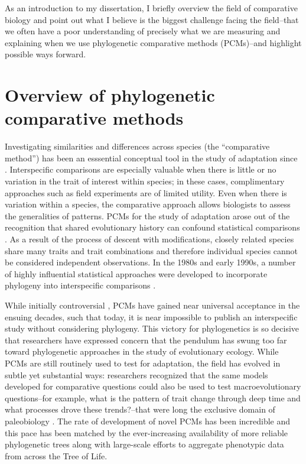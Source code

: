 As an introduction to my dissertation, I briefly overview the field of comparative biology \citep[for a more comprehensive discussion, see][]{PennellHarmon} and point out what I believe is the biggest challenge facing the field--that we often have a poor understanding of precisely what we are measuring and explaining when we use phylogenetic comparative methods (PCMs)--and highlight possible ways forward.

\section{Overview of phylogenetic comparative methods}

Investigating similarities and differences across species (the ``comparative method'') has been an esssential conceptual tool in the study of adaptation since \citet{Darwin1859}. Interspecific comparisons are especially valuable when there is little or no variation in the trait of interest within species; in these cases, complimentary approaches such as field experiments are of limited utility. Even when there is variation within a species, the comparative approach allows biologists to assess the generalities of patterns. PCMs for the study of adaptation arose out of the recognition that shared evolutionary history can confound statistical comparisons \citep{HarveyPagel1991}. As a result of the process of descent with modifications, closely related species share many traits and trait combinations and therefore individual species cannot be considered independent observations. In the 1980s and early 1990s, a number of highly influential statistical approaches were developed to incorporate phylogeny into interspecific comparisons \citep{Ridley1983, Felsenstein1985, Grafen1989, Maddison1990, HarveyPagel1991, Lynch1991, Pagel1994}. 

While initially controversial \citep[e.g.,][]{Westoby1995}, PCMs have gained near universal acceptance in the ensuing decades, such that today, it is near impossible to publish an interspecific study without considering phylogeny. This victory for phylogenetics is so decisive that researchers have expressed concern that the pendulum has swung too far toward phylogenetic approaches \citep{Losos2011} in the study of evolutionary ecology. While PCMs are still routinely used to test for adaptation, the field has evolved in subtle yet substantial ways: researchers recognized that the same models developed for comparative questions could also be used to test macroevolutionary questions--for example, what is the pattern of trait change through deep time and what processes drove these trends?--that were long the exclusive domain of paleobiology \citep{HansenMartins1996, Hansen1997, Schluter1997, Pagel1997, MooersSchluter1998, Pagel1999, Mooers1999}. The rate of development of novel PCMs has been incredible and this pace has been matched by the ever-increasing availability of more reliable phylogenetic trees along with large-scale efforts to aggregate phenotypic data from across the Tree of Life.

